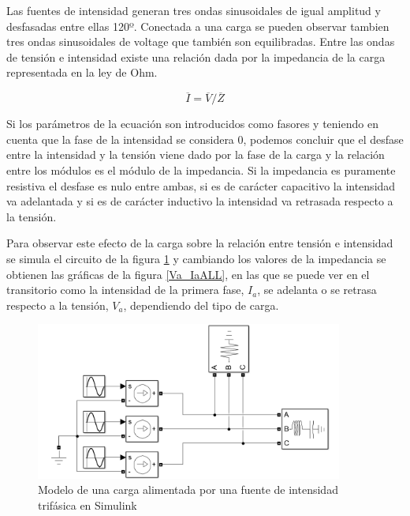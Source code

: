 \documentclass{book}
\begin{document}
Las fuentes de intensidad generan tres ondas sinusoidales de igual amplitud y desfasadas entre ellas 120º. Conectada a una carga se pueden observar tambien tres ondas sinusoidales de voltage que tambi\'en son equilibradas. Entre las ondas de tensi\'on e intensidad existe una relaci\'on dada por la impedancia de la carga representada en la ley de Ohm. \par
\begin{equation}\label{eq:ohm}
	\overline{I}=\overline{V}/\overline{Z}
\end{equation} \par
Si los par\'ametros de la ecuaci\'on son introducidos como fasores y teniendo en cuenta que la fase de la intensidad se considera 0, podemos concluir que el desfase entre la intensidad y la tensi\'on viene dado por la fase de la carga y la relaci\'on entre los m\'odulos es el m\'odulo de la impedancia. Si la impedancia es puramente resistiva el desfase es nulo entre ambas, si es de car\'acter capacitivo la intensidad va adelantada y si es de car\'acter inductivo la intensidad va retrasada respecto a la tensi\'on. \par

Para observar este efecto de la carga sobre la relaci\'on entre tensi\'on e intensidad se simula el circuito de la figura \ref{LoadAnalyserModel} y cambiando los valores de la impedancia se obtienen las gr\'aficas de la figura \ref {Va_IaALL}, en las que se puede ver en el transitorio como la intensidad de la primera fase, $I_a$,  se adelanta o se retrasa respecto a la tensi\'on, $V_a$, dependiendo del tipo de carga.  \par

\begin{figure}[h!]
\centering
\includegraphics[width=0.9\textwidth]{LoadAnalyserModel.PNG}
\caption{Modelo de una carga alimentada por una fuente de intensidad trif\'asica en Simulink}
\label{LoadAnalyserModel}
\end{figure}
\end{document}
